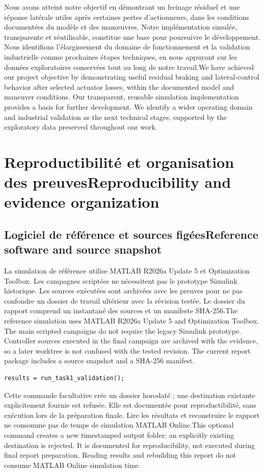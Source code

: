 \documentclass[11pt,a4paper,oneside]{report}
\newcommand{\bi}[2]{\iffrench #2\else #1\fi}
\newcommand{\chap}[2]{\chapter{\bi{#1}{#2}}}
\renewcommand{\sec}[2]{\section{\bi{#1}{#2}}}
\begin{document}
\bi{We have achieved our project objective by demonstrating useful residual braking and lateral-control behavior after selected actuator losses, within the documented model and maneuver conditions. Our transparent, reusable simulation implementation provides a basis for further development. We identify a wider operating domain and industrial validation as the next technical stages, supported by the exploratory data preserved throughout our work.}{Nous avons atteint notre objectif en démontrant un freinage résiduel et une réponse latérale utiles après certaines pertes d'actionneurs, dans les conditions documentées du modèle et des man\oe{}uvres. Notre implémentation simulée, transparente et réutilisable, constitue une base pour poursuivre le développement. Nous identifions l'élargissement du domaine de fonctionnement et la validation industrielle comme prochaines étapes techniques, en nous appuyant sur les données exploratoires conservées tout au long de notre travail.}
\appendix
\chap{Reproducibility and evidence organization}{Reproductibilité et organisation des preuves}
\begingroup\small{}
\sec{Reference software and source snapshot}{Logiciel de référence et sources figées}
\bi{The reference simulation uses MATLAB R2026a Update 5 and Optimization Toolbox. The main scripted campaigns do not require the legacy Simulink prototype. Controller sources executed in the final campaign are archived with the evidence, so a later worktree is not confused with the tested revision. The current report package includes a source snapshot and a SHA-256 manifest.}{La simulation de référence utilise MATLAB R2026a Update 5 et Optimization Toolbox. Les campagnes scriptées ne nécessitent pas le prototype Simulink historique. Les sources exécutées sont archivées avec les preuves pour ne pas confondre un dossier de travail ultérieur avec la révision testée. Le dossier du rapport comprend un instantané des sources et un manifeste SHA-256.}
\begin{verbatim}
results = run_task1_validation();
\end{verbatim}
\bi{This optional command creates a new timestamped output folder; an explicitly existing destination is rejected. It is documented for reproducibility, not executed during final report preparation. Reading results and rebuilding this report do not consume MATLAB Online simulation time.}{Cette commande facultative crée un dossier horodaté ; une destination existante explicitement fournie est refusée. Elle est documentée pour reproductibilité, sans exécution lors de la préparation finale. Lire les résultats et reconstruire le rapport ne consomme pas de temps de simulation MATLAB Online.}
\end{document}
